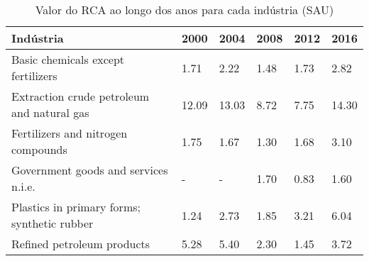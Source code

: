 \begin{table}
\centering
\caption{Valor do RCA ao longo dos anos para cada indústria (SAU)}
\begin{tabular}{p{6cm}p{1.5cm}p{1.5cm}p{1.5cm}p{1.5cm}p{1.5cm}}
\toprule
                                  Indústria &  2000 &  2004 & 2008 & 2012 &  2016 \\
\midrule
         Basic chemicals except fertilizers &  1.71 &  2.22 & 1.48 & 1.73 &  2.82 \\
 Extraction crude petroleum and natural gas & 12.09 & 13.03 & 8.72 & 7.75 & 14.30 \\
         Fertilizers and nitrogen compounds &  1.75 &  1.67 & 1.30 & 1.68 &  3.10 \\
       Government goods and services n.i.e. &     - &     - & 1.70 & 0.83 &  1.60 \\
Plastics in primary forms; synthetic rubber &  1.24 &  2.73 & 1.85 & 3.21 &  6.04 \\
                 Refined petroleum products &  5.28 &  5.40 & 2.30 & 1.45 &  3.72 \\
\bottomrule
\end{tabular}
\end{table}
